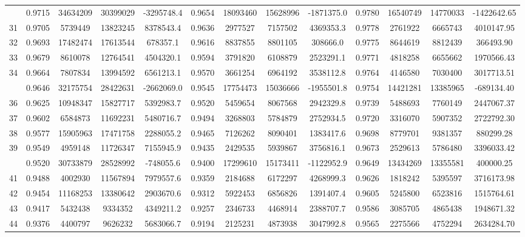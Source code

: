 \documentclass[
  12pt,
]{article}
\begin{document}
\begin{longtable}[t]{lcccccccccccc}
\addlinespace
30 & 0.9715 & 34634209 & 30399029 & -3295748.4 & 0.9654 & 18093460 & 15628996 & -1871375.0 & 0.9780 & 16540749 & 14770033 & -1422642.65\\
31 & 0.9705 & 5739449 & 13823245 & 8378543.4 & 0.9636 & 2977527 & 7157502 & 4369353.3 & 0.9778 & 2761922 & 6665743 & 4010147.95\\
32 & 0.9693 & 17482474 & 17613544 & 678357.1 & 0.9616 & 8837855 & 8801105 & 308666.0 & 0.9775 & 8644619 & 8812439 & 366493.90\\
33 & 0.9679 & 8610078 & 12764541 & 4504320.1 & 0.9594 & 3791820 & 6108879 & 2523291.1 & 0.9771 & 4818258 & 6655662 & 1970566.43\\
34 & 0.9664 & 7807834 & 13994592 & 6561213.1 & 0.9570 & 3661254 & 6964192 & 3538112.8 & 0.9764 & 4146580 & 7030400 & 3017713.51\\
\addlinespace
35 & 0.9646 & 32175754 & 28422631 & -2662069.0 & 0.9545 & 17754473 & 15036666 & -1955501.8 & 0.9754 & 14421281 & 13385965 & -689134.40\\
36 & 0.9625 & 10948347 & 15827717 & 5392983.7 & 0.9520 & 5459654 & 8067568 & 2942329.8 & 0.9739 & 5488693 & 7760149 & 2447067.37\\
37 & 0.9602 & 6584873 & 11692231 & 5480716.7 & 0.9494 & 3268803 & 5784879 & 2752934.5 & 0.9720 & 3316070 & 5907352 & 2722792.30\\
38 & 0.9577 & 15905963 & 17471758 & 2288055.2 & 0.9465 & 7126262 & 8090401 & 1383417.6 & 0.9698 & 8779701 & 9381357 & 880299.28\\
39 & 0.9549 & 4959148 & 11726347 & 7155945.9 & 0.9435 & 2429535 & 5939867 & 3756816.1 & 0.9673 & 2529613 & 5786480 & 3396033.42\\
\addlinespace
40 & 0.9520 & 30733879 & 28528992 & -748055.6 & 0.9400 & 17299610 & 15173411 & -1122952.9 & 0.9649 & 13434269 & 13355581 & 400000.25\\
41 & 0.9488 & 4002930 & 11567894 & 7979557.6 & 0.9359 & 2184688 & 6172297 & 4268999.3 & 0.9626 & 1818242 & 5395597 & 3716173.98\\
42 & 0.9454 & 11168253 & 13380642 & 2903670.6 & 0.9312 & 5922453 & 6856826 & 1391407.4 & 0.9605 & 5245800 & 6523816 & 1515764.61\\
43 & 0.9417 & 5432438 & 9334352 & 4349211.2 & 0.9257 & 2346733 & 4468914 & 2388707.7 & 0.9586 & 3085705 & 4865438 & 1948671.32\\
44 & 0.9376 & 4400797 & 9626232 & 5683066.7 & 0.9194 & 2125231 & 4873938 & 3047992.8 & 0.9565 & 2275566 & 4752294 & 2634284.70\\

\end{longtable}
\end{document}
